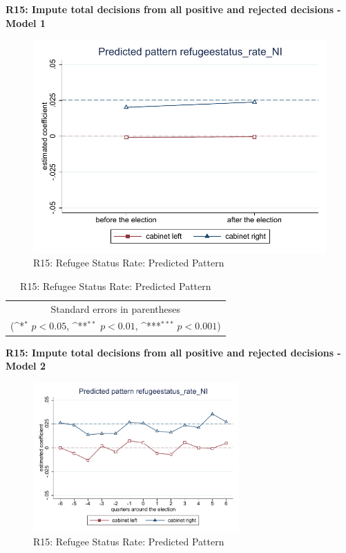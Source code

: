 \documentclass[10pt,a4paper]{scrartcl}
\begin{document}
\clearpage
\textbf{R15: Impute total decisions from all positive and rejected decisions - Model 1}
\begin{figure}[!ht]
	\centering
	\includegraphics[width=1\textwidth]{figures_edited/refugeestatus_rate_NI_graph1_R15.pdf}
	\caption{R15: Refugee Status Rate: Predicted Pattern}
\end{figure}

\begin{table}[!ht]\centering
	\renewcommand{\arraystretch}{1.25}
	\def\sym#1{\ifmmode^{#1}\else\(^{#1}\)\fi}
	\caption{R15: Refugee Status Rate: Predicted Pattern}
	\begin{tabular}{l*{2}{c}}
		\hline\hline
		
		\hline\hline
		\multicolumn{3}{c}{\footnotesize Standard errors in parentheses} \\
		\multicolumn{3}{c}{\footnotesize (\sym{*} \(p<0.05\), \sym{**} \(p<0.01\), \sym{***} \(p<0.001\))}\\
	\end{tabular}
\end{table}

\clearpage
\textbf{R15: Impute total decisions from all positive and rejected decisions - Model 2}
\begin{figure}[!ht]
	\centering
	\includegraphics[width=0.7\textwidth]{figures_edited/refugeestatus_rate_NI_graph2_R15.pdf}
	\caption{R15: Refugee Status Rate: Predicted Pattern}
\end{figure}
\end{document}
